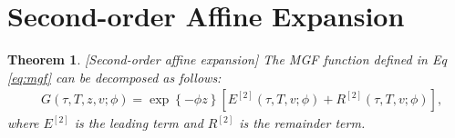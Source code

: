 \documentclass[pdftex,11pt,a4paper] {article}
\newtheorem{theorem}{Theorem}[section]
\begin{document}
\section{Second-order Affine Expansion}\label{app:second_order_ae}

\begin{theorem}\label{thm:affine_expansion_ord2} [Second-order affine expansion] The MGF function defined in Eq \eqref{eq:mgf} can be decomposed as follows:
\begin{equation}\label{eq:aff_expan_ord2}
\begin{split}
& G(\tau,T, z,v; \phi)= \exp \left\{-\phi z \right\} \left[ E^{[2]}(\tau,T, v; \phi) + R^{[2]}(\tau,T,v; \phi)\right],
\end{split}
\end{equation}
where $E^{[2]}$ is the leading term and $R^{[2]}$ is the remainder term.



\end{theorem}
\end{document}

